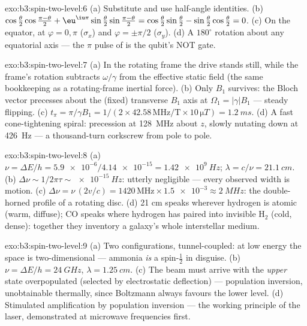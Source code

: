 \begin{solution}{exo:b3:spin-two-level:6}
(a) Substitute and use half-angle identities. (b)
$\cos\tfrac\theta2\cos\tfrac{\pi-\theta}2 +
\eu^{\iu\pi}\sin\tfrac\theta2\sin\tfrac{\pi-\theta}2 =
\cos\tfrac\theta2\sin\tfrac\theta2 -
\sin\tfrac\theta2\cos\tfrac\theta2 = 0$. (c) On the equator, at
$\varphi = 0, \pi$ ($\sigma_x$) and $\varphi = \pm\pi/2$
($\sigma_y$). (d) A $180^\circ$ rotation about any equatorial axis
--- the $\pi$ pulse of  is the qubit's NOT gate.
\end{solution}

\begin{solution}{exo:b3:spin-two-level:7}
(a) In the rotating frame the drive stands still, while the frame's
rotation subtracts $\omega/\gamma$ from the effective static field
(the same bookkeeping as a rotating-frame inertial force). (b) Only
$B_1$ survives: the Bloch vector precesses about the (fixed)
transverse $B_1$ axis at $\Omega_1 = |\gamma|B_1$ --- steady
flipping. (c) $t_\pi = \pi/\gamma B_1 = 1/(2 \times 42.58\,\text{
MHz/T} \times 10\,\unit{\micro T}) = \qty{1.2}{ms}$. (d) A fast
cone-tightening spiral: precession at \qty{128}{MHz} about $z$,
slowly nutating down at \qty{426}{Hz} --- a thousand-turn
corkscrew from pole to pole.
\end{solution}

\begin{solution}{exo:b3:spin-two-level:8}
(a) $\nu = \Delta E/h = \num{5.9e-6}/\num{4.14e-15} =
\qty{1.42e9}{Hz}$; $\lambda = c/\nu = \qty{21.1}{cm}$. (b) $\Delta
\nu \sim 1/2\pi\tau \sim \qty{e-15}{Hz}$: utterly negligible ---
every observed width is motion. (c) $\Delta\nu =
\nu\,(2v/c) = 1420\,\text{MHz} \times \num{1.5e-3} \approx
\qty{2}{MHz}$: the double-horned profile of a rotating disc. (d)
21 cm speaks wherever hydrogen is atomic (warm, diffuse); CO
speaks where hydrogen has paired into invisible H$_2$ (cold,
dense): together they inventory a galaxy's whole interstellar
medium.
\end{solution}

\begin{solution}{exo:b3:spin-two-level:9}
(a) Two configurations, tunnel-coupled: at low energy the space is
two-dimensional --- ammonia \emph{is} a spin-$\tfrac12$ in
disguise. (b) $\nu = \Delta E/h = \qty{24}{GHz}$, $\lambda =
\qty{1.25}{cm}$. (c) The beam must arrive with the \emph{upper}
state overpopulated (selected by electrostatic deflection) ---
population inversion, unobtainable thermally, since Boltzmann
always favours the lower level. (d) Stimulated amplification by
population inversion --- the working principle of the laser,
demonstrated at microwave frequencies first.
\end{solution}

